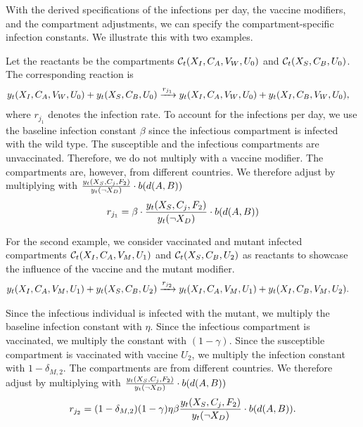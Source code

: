 With the derived specifications of the infections per day, the vaccine modifiers, and the compartment adjustments, we can specify the compartment-specific infection constants. We illustrate this with two examples. 

\begin{example}
Let the reactants be the compartments $\mathcal{C}_t(X_{I}, C_A, V_W, U_0)$ and $\mathcal{C}_t(X_{S}, C_B, U_0)$. The corresponding reaction is
\begin{align}
y_t(X_{I}, C_A, V_W, U_0) + y_t(X_{S}, C_B, U_0) &\xrightarrow{ r_{j_1}} y_t(X_{I}, C_A, V_W, U_0) + y_t(X_{I}, C_B, V_W, U_0),
\end{align}
where $r_{j_1}$ denotes the infection rate. To account for the infections per day, we use the baseline infection constant $\beta$ since the infectious compartment is infected with the wild type. The susceptible and the infectious compartments are unvaccinated. Therefore, we do not multiply with a vaccine modifier. The compartments are, however, from different countries. We therefore adjust by multiplying with $\frac{y_t(X_S, C_j, F_2)}{y_t(\neg X_D)} \cdot b(d(A, B))$
\begin{align}
r_{j_1} = \beta \cdot \frac{y_t(X_S, C_j, F_2)}{y_t(\neg X_D)} \cdot b(d(A, B))
\end{align}
\end{example}

\begin{example}
For the second example, we consider vaccinated and mutant infected compartments $\mathcal{C}_t(X_{I}, C_A, V_M, U_1)$ and $\mathcal{C}_t(X_{S}, C_B, U_2)$ as reactants to showcase the influence of the vaccine and the mutant modifier. 
\begin{align}
y_t(X_{I}, C_A, V_M, U_1) + y_t(X_{S}, C_B, U_2) &\xrightarrow{ r_{j_2}} y_t(X_{I}, C_A, V_M, U_1) + y_t(X_{I}, C_B, V_M, U_2).
\end{align}

Since the infectious individual is infected with the mutant, we multiply the baseline infection constant with $\eta$. Since the infectious compartment is vaccinated, we multiply the constant with $(1-\gamma)$. Since the susceptible compartment is vaccinated with vaccine $U_2$, we multiply the infection constant with $1-\delta_{M,2}$. The compartments are from different countries. We therefore adjust by multiplying with $\frac{y_t(X_S, C_j, F_2)}{y_t(\neg X_D)} \cdot b(d(A, B))$
\begin{align}
r_{j_2} = (1-\delta_{M,2}) (1-\gamma) \eta \beta  \frac{y_t(X_S, C_j, F_2)}{y_t(\neg X_D)} \cdot b(d(A, B)).
\end{align}
\end{example}

